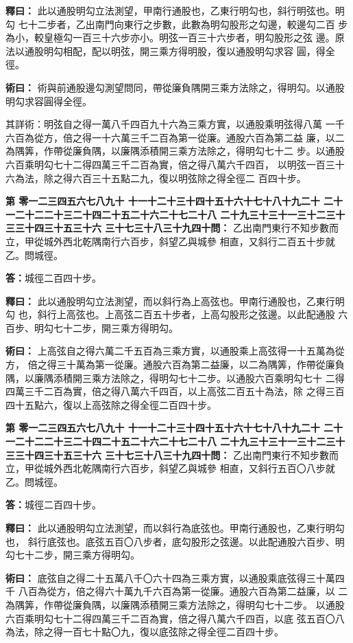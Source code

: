\documentclass[11pt,a4paper]{article}
\newcounter{probnum}
\newcommand{\chnum}[1]{%
  \ifcase#1 零\or 一\or 二\or 三\or 四\or 五\or 六\or 七\or 八\or 九\or 十\or
    十一\or 十二\or 十三\or 十四\or 十五\or 十六\or 十七\or 十八\or 十九\or 二十\or
    二十一\or 二十二\or 二十三\or 二十四\or 二十五\or 二十六\or 二十七\or 二十八\or
    二十九\or 三十\or 三十一\or 三十二\or 三十三\or 三十四\or 三十五\or 三十六\or
    三十七\or 三十八\or 三十九\or 四十\fi}
\newcommand{\problem}[1]{\stepcounter{probnum}\par\noindent\textbf{第\chnum{\value{probnum}}問：}#1\par}
\newcommand{\answer}[1]{\par\noindent\textbf{答：}#1\par}
\newcommand{\shiyi}[1]{\par\noindent\textbf{釋曰：}#1\par}
\newcommand{\shuyue}[1]{\par\noindent\textbf{術曰：}#1\par}
\begin{document}
\shiyi{
此以通股明勾立法測望，甲南行通股也，乙東行明勾也，斜行明弦也。明勾
七十二步者，乙出南門向東行之步數，此數為明勾股形之勾邊，較邊勾二百
步為小，較皇極勾一百三十六步亦小。明弦一百三十六步者，明勾股形之弦
邊。原法以通股明勾相配，配以明弦，開三乘方得明股，復以通股明勾求容
圓，得全徑。
}

\shuyue{
術與前通股邊勾測望問同，帶從廉負隅開三乘方法除之，得明勾。以通股
明勾求容圓得全徑。

其詳術：明弦自之得一萬八千四百九十六為三乘方實，以通股乘明弦得八萬
一千六百為從方，倍之得一十六萬三千二百為第一從廉。通股六百為第二益
廉，以二為隅筭，作帶從廉負隅，以廉隅添積開三乘方法除之，得明勾七十二
步。以通股六百乘明勾七十二得四萬三千二百為實，倍之得八萬六千四百，
以明弦一百三十六為法，除之得六百三十五點二九，復以明弦除之得全徑二
百四十步。
}

\vspace{0.3cm}
\problem{
乙出南門東行不知步數而立，甲從城外西北乾隅南行六百步，斜望乙與城參
相直，又斜行二百五十步就乙。問城徑。
}

\answer{城徑二百四十步。}

\shiyi{
此以通股明勾立法測望，而以斜行為上高弦也。甲南行通股也，乙東行明勾
也，斜行上高弦也。上高弦二百五十步者，上高勾股形之弦邊。以此配通股
六百步、明勾七十二步，開三乘方得明勾。
}

\shuyue{
上高弦自之得六萬二千五百為三乘方實，以通股乘上高弦得一十五萬為從方，
倍之得三十萬為第一從廉。通股六百為第二益廉，以二為隅筭，作帶從廉負
隅，以廉隅添積開三乘方法除之，得明勾七十二步。以通股六百乘明勾七十
二得四萬三千二百為實，倍之得八萬六千四百，以上高弦二百五十為法，除
之得三百四十五點六，復以上高弦除之得全徑二百四十步。
}

\vspace{0.3cm}
\problem{
乙出南門東行不知步數而立，甲從城外西北乾隅南行六百步，斜望乙與城參
相直，又斜行五百〇八步就乙。問城徑。
}

\answer{城徑二百四十步。}

\shiyi{
此以通股明勾立法測望，而以斜行為底弦也。甲南行通股也，乙東行明勾也，
斜行底弦也。底弦五百〇八步者，底勾股形之弦邊。以此配通股六百步、明
勾七十二步，開三乘方得明勾。
}

\shuyue{
底弦自之得二十五萬八千〇六十四為三乘方實，以通股乘底弦得三十萬四千
八百為從方，倍之得六十萬九千六百為第一從廉。通股六百為第二益廉，以
二為隅筭，作帶從廉負隅，以廉隅添積開三乘方法除之，得明勾七十二步。
以通股六百乘明勾七十二得四萬三千二百為實，倍之得八萬六千四百，以底
弦五百〇八為法，除之得一百七十點〇九，復以底弦除之得全徑二百四十步。
}
\end{document}

